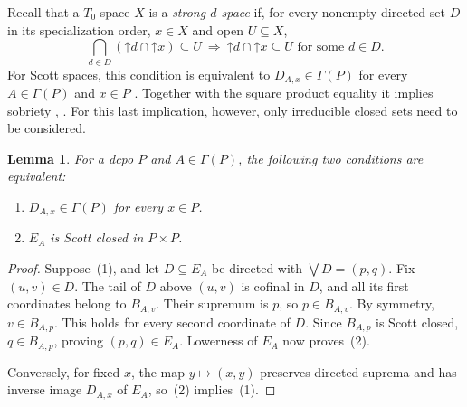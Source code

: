 \documentclass[10pt,a4paper]{amsart}
\newtheorem{lemma}[theorem]{Lemma}
\numberwithin{equation}{section}
\newcommand{\up}[1]{\mathord{\uparrow}#1}
\begin{document}
Recall that a $T_0$ space $X$ is a \emph{strong $d$-space} if, for every nonempty directed set $D$ in its specialization order, $x\in X$ and open $U\subseteq X$,
\[
 \bigcap_{d\in D}(\up d\cap\up x)\subseteq U
 ~\Longrightarrow~
 \up d\cap\up x\subseteq U\text{ for some }d\in D.
\]
For Scott spaces, this condition is equivalent to $D_{A,x}\in\Gamma(P)$ for every $A\in\Gamma(P)$ and $x\in P$ \cite[Theorem~61]{LawsonXuLower}. Together with the square product equality it implies sobriety \cite[Theorem~5.11]{LawsonXu}, \cite[Theorem~76]{LawsonXuLower}. For this last implication, however, only irreducible closed sets need to be considered.

\begin{lemma}\label{lem:upper-bound-sections}
For a dcpo $P$ and $A\in\Gamma(P)$, the following two conditions are equivalent:
\begin{enumerate}[label=\textup{(\arabic*)}]
\item $D_{A,x}\in\Gamma(P)$ for every $x\in P$.
\item $E_A$ is Scott closed in $P\times P$.
\end{enumerate}
\end{lemma}
\begin{proof}
Suppose~(1), and let $D\subseteq E_A$ be directed with $\bigvee D=(p,q)$. Fix $(u,v)\in D$. The tail of $D$ above $(u,v)$ is cofinal in $D$, and all its first coordinates belong to $B_{A,v}$. Their supremum is $p$, so $p\in B_{A,v}$. By symmetry, $v\in B_{A,p}$. This holds for every second coordinate of $D$. Since $B_{A,p}$ is Scott closed, $q\in B_{A,p}$, proving $(p,q)\in E_A$. Lowerness of $E_A$ now proves~(2).

Conversely, for fixed $x$, the map $y\mapsto(x,y)$ preserves directed suprema and has inverse image $D_{A,x}$ of $E_A$, so~(2) implies~(1).
\end{proof}
\end{document}

